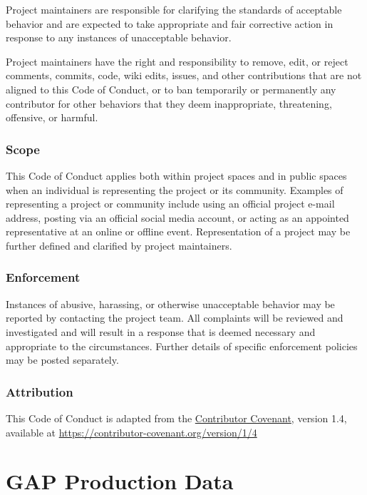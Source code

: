 \documentclass[
  letterpaper,
  oneside,
  open=any]{scrbook}
\begin{document}
Project maintainers are responsible for clarifying the standards of
acceptable behavior and are expected to take appropriate and fair
corrective action in response to any instances of unacceptable behavior.

Project maintainers have the right and responsibility to remove, edit,
or reject comments, commits, code, wiki edits, issues, and other
contributions that are not aligned to this Code of Conduct, or to ban
temporarily or permanently any contributor for other behaviors that they
deem inappropriate, threatening, offensive, or harmful.

\section{Scope}\label{scope}

This Code of Conduct applies both within project spaces and in public
spaces when an individual is representing the project or its community.
Examples of representing a project or community include using an
official project e-mail address, posting via an official social media
account, or acting as an appointed representative at an online or
offline event. Representation of a project may be further defined and
clarified by project maintainers.

\section{Enforcement}\label{enforcement}

Instances of abusive, harassing, or otherwise unacceptable behavior may
be reported by contacting the project team. All complaints will be
reviewed and investigated and will result in a response that is deemed
necessary and appropriate to the circumstances. Further details of
specific enforcement policies may be posted separately.

\section{Attribution}\label{attribution}

This Code of Conduct is adapted from the
\href{https://contributor-covenant.org}{Contributor Covenant}, version
1.4, available at
\href{https://contributor-covenant.org/version/1/4/}{https://contributor-covenant.org/version/1/4}

\part{GAP Production Data}
\end{document}
